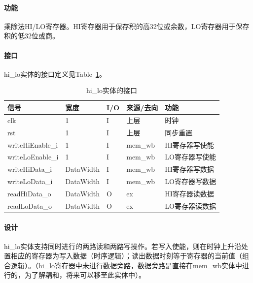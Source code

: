 \documentclass{article}
\begin{document}
\begin{spacing}{1.4}
\paragraph{功能}\mbox{}

乘除法HI/LO寄存器。HI寄存器用于保存积的高32位或余数，LO寄存器用于保存积的低32位或商。

\paragraph{接口}\mbox{}

hi\_lo实体的接口定义见Table~\ref{tb:hilo-interface}。
\begin{table}[!htb]
\begin{center}
\begin{tabular*}{17cm}{l|l|l|l|p{5cm}}
\hline
\textbf{信号}&\textbf{宽度}&\textbf{I/O}&\textbf{来源/去向}&\textbf{功能} \\
\hline clk                     & 1                      & I     & 上层         & 时钟 \\
\hline rst                     & 1                      & I     & 上层         & 同步重置 \\
\hline writeHiEnable\_i        & 1                      & I     & mem\_wb      & HI寄存器写使能 \\
\hline writeLoEnable\_i        & 1                      & I     & mem\_wb      & LO寄存器写使能 \\
\hline writeHiData\_i          & DataWidth              & I     & mem\_wb      & HI寄存器写数据 \\
\hline writeLoData\_i          & DataWidth              & I     & mem\_wb      & LO寄存器写数据 \\
\hline readHiData\_o           & DataWidth              & O     & ex           & HI寄存器读数据 \\
\hline readLoData\_o           & DataWidth              & O     & ex           & LO寄存器读数据 \\
\hline
\end{tabular*}
\caption{hi\_lo实体的接口}
\label{tb:hilo-interface}
\end{center}
\end{table}

\paragraph{设计}\mbox{}

hi\_lo实体支持同时进行的两路读和两路写操作。若写入使能，则在时钟上升沿处置相应的寄存器为写入数据（时序逻辑）；读出数据时刻等于寄存器的当前值（组合逻辑）。（hi\_lo寄存器中未进行数据旁路，数据旁路是直接在mem\_wb实体中进行的，为了解耦和，将来可以移至此实体中）。


\end{spacing}
\end{document}
